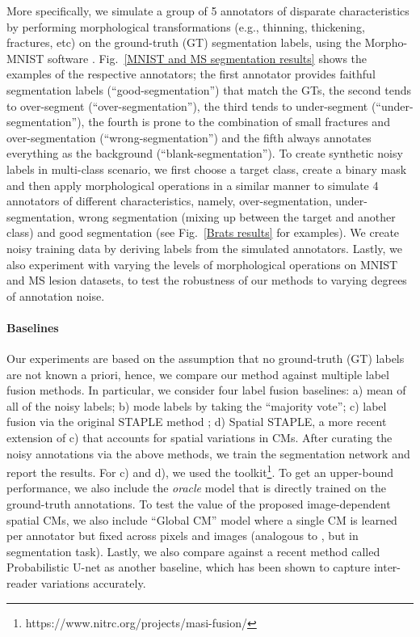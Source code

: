 More specifically, we simulate a group of 5 annotators of disparate characteristics by performing morphological transformations (e.g., thinning, thickening, fractures, etc) on the ground-truth (GT) segmentation labels, using the Morpho-MNIST software \cite{castro2019morphomnist}. Fig.~\ref{MNIST and MS segmentation results} shows the examples of the respective annotators; the first annotator provides faithful segmentation labels (``good-segmentation'') that match the GTs, the second tends to over-segment (``over-segmentation''), the third tends to under-segment (``under-segmentation''), the fourth is prone to the combination of small fractures and over-segmentation (``wrong-segmentation'') and the fifth always annotates everything as the background (``blank-segmentation''). To create synthetic noisy labels in multi-class scenario, we first choose a target class, create a binary mask and then apply morphological operations in a similar manner to simulate 4 annotators of different characteristics, namely, over-segmentation, under-segmentation, wrong segmentation (mixing up between the target and another class) and good segmentation (see Fig.~\ref{Brats results} for examples). We create noisy training data by deriving labels from the simulated annotators. Lastly, we also experiment with varying the levels of morphological operations on MNIST and MS lesion datasets, to test the robustness of our methods to varying degrees of annotation noise.


\paragraph{Baselines}
Our experiments are based on the assumption that no ground-truth (GT) labels are not known a priori, hence, we compare our method against multiple label fusion methods. In particular, we consider four label fusion baselines: a) mean of all of the noisy labels; b) mode labels by taking the ``majority vote''; c) label fusion via the original STAPLE method \cite{warfield2004simultaneous}; d) Spatial STAPLE, a more recent extension of c) that accounts for spatial variations in CMs. After curating the noisy annotations via the above methods, we train the segmentation network and report the results. For c) and d), we used the toolkit\footnote{https://www.nitrc.org/projects/masi-fusion/}. To get an upper-bound performance, we also include the \textit{oracle} model that is directly trained on the ground-truth annotations. To test the value of the proposed image-dependent spatial CMs, we also include ``Global CM'' model where a single CM is learned per annotator but fixed across pixels and images (analogous to \etal \cite{raykar2009supervised,khetan2017learning,tanno2019learning}, but in segmentation task). Lastly, we also compare against a recent method called Probabilistic U-net as another baseline, which has been shown to capture inter-reader variations accurately. 

